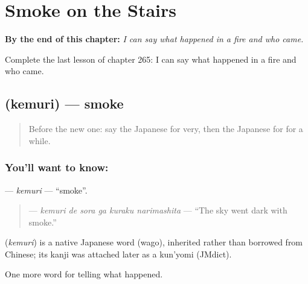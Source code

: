 
\chapter{Smoke on the Stairs}
\label{ch:ja-smoke-on-the-stairs}

\begin{chapteropening}
\textbf{By the end of this chapter:} \emph{I can say what happened in a fire and who came.}

Complete the last lesson of chapter 265: I can say what happened in a fire and who came.
\end{chapteropening}

\section[\texorpdfstring{\ja{けむり} (kemuri)}{けむり (kemuri)}]{ (kemuri) — smoke}

\label{lesson:JA-C265-kemuri}



\begin{quote}
Before the new one: say the Japanese for very, then the Japanese for for a while.
\end{quote}

\subsection*{You'll want to know: }
\textbf{} — \emph{kemuri} — \textquotedblleft{}smoke\textquotedblright{}.

\begin{quote}
\textbf{   } — \emph{kemuri de sora ga kuraku narimashita} — \textquotedblleft{}The sky went dark with smoke.\textquotedblright{}
\end{quote}

\begin{cousinweb}
\textbf{} (\emph{kemuri}) is a native Japanese word (wago), inherited rather than borrowed from Chinese; its kanji was attached later as a kun'yomi (JMdict).
\end{cousinweb}

\begin{grammarlens}[title={What you've built}]
One more word for telling what happened.
\end{grammarlens}

